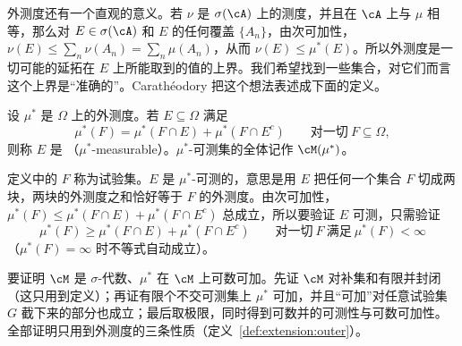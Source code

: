 外测度还有一个直观的意义。若 $\nu$ 是 $\sigma(\cA)$ 上的测度，并且在 $\cA$ 上与 $\mu$ 相等，那么对 $E\in\sigma(\cA)$ 和 $E$ 的任何覆盖 $\{A_n\}$，由次可加性，$\nu(E)\leqslant\sum_n\nu(A_n)=\sum_n\mu(A_n)$，从而 $\nu(E)\leqslant\mu^*(E)$。所以外测度是一切可能的延拓在 $E$ 上所能取到的值的上界。我们希望找到一些集合，对它们而言这个上界是“准确的”。Carathéodory 把这个想法表述成下面的定义。

\begin{definition}[Carathéodory 可测]\label{def:extension:caratheodory}
设 $\mu^*$ 是 $\Omega$ 上的外测度。若 $E\subseteq\Omega$ 满足
\[
\mu^*(F)=\mu^*(F\cap E)+\mu^*(F\cap E^c)\qquad\text{对一切}\ F\subseteq\Omega,
\]
则称 $E$ 是 （$\mu^*$-measurable）。$\mu^*$-可测集的全体记作 $\cM(\mu^*)$。
\end{definition}

定义中的 $F$ 称为试验集。$E$ 是 $\mu^*$-可测的，意思是用 $E$ 把任何一个集合 $F$ 切成两块，两块的外测度之和恰好等于 $F$ 的外测度。由次可加性，$\mu^*(F)\leqslant\mu^*(F\cap E)+\mu^*(F\cap E^c)$ 总成立，所以要验证 $E$ 可测，只需验证
\begin{equation}\label{eq:extension:caratheodory-half}
\mu^*(F)\geqslant\mu^*(F\cap E)+\mu^*(F\cap E^c)\qquad\text{对一切}\ F\ \text{满足}\ \mu^*(F)<\infty
\end{equation}
（$\mu^*(F)=\infty$ 时不等式自动成立）。

\begin{remark}[证明思路]
要证明 $\cM$ 是 $\sigma$-代数、$\mu^*$ 在 $\cM$ 上可数可加。先证 $\cM$ 对补集和有限并封闭（这只用到定义）；再证有限个不交可测集上 $\mu^*$ 可加，并且“可加”对任意试验集 $G$ 截下来的部分也成立；最后取极限，同时得到可数并的可测性与可数可加性。全部证明只用到外测度的三条性质（定义~\ref{def:extension:outer}）。
\end{remark}

